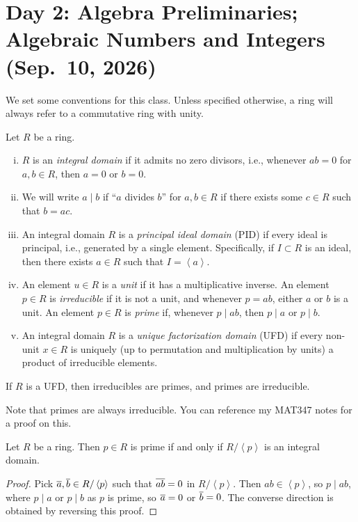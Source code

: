 \section{Day 2: Algebra Preliminaries; Algebraic Numbers and Integers (Sep.\ 10, 2026)}
We set some conventions for this class. Unless specified otherwise, a ring will always refer to a commutative ring with unity.
\begin{definition}[Preliminaries] \label{defn:class_conventions}
    Let $R$ be a ring.
    \begin{enumerate}[(i)]
        \item $R$ is an \textit{integral domain} if it admits no zero divisors, i.e., whenever $ab = 0$ for $a, b \in R$, then $a = 0$ or $b = 0$.
        \item We will write $a \mid b$ if ``$a$ divides $b$'' for $a, b \in R$ if there exists some $c \in R$ such that $b = ac$.
        \item An integral domain $R$ is a \textit{principal ideal domain} (PID) if every ideal is principal, i.e., generated by a single element. Specifically, if $I \subset R$ is an ideal, then there exists $a \in R$ such that $I = \left<a\right>$.
        \item An element $u \in R$ is a \textit{unit} if it has a multiplicative inverse. An element $p \in R$ is \textit{irreducible} if it is not a unit, and whenever $p = ab$, either $a$ or $b$ is a unit. An element $p \in R$ is \textit{prime} if, whenever $p \mid ab$, then $p \mid a$ or $p \mid b$.
        \item An integral domain $R$ is a \textit{unique factorization domain} (UFD) if every non-unit $x \in R$ is uniquely (up to permutation and multiplication by units) a product of irreducible elements.
    \end{enumerate}
\end{definition}

\begin{proposition} \label{prop:UFD_irreducible_prime}
    If $R$ is a UFD, then irreducibles are primes, and primes are irreducible.
\end{proposition}
Note that primes are always irreducible. You can reference my MAT347 notes for a proof on this.

\begin{proposition} \label{prop:quotient_by_prime_ideal_iff_integral_domain} %
    Let $R$ be a ring. Then $p \in R$ is prime if and only if $R/\left<p\right>$ is an integral domain.
\end{proposition}
\begin{proof}
    Pick $\overline a, \overline b \in R/\left<p\right>$ such that $\overline{ab} = 0$ in $R/\left<p\right>$. Then $ab \in \left<p\right>$, so $p \mid ab$, where $p \mid a$ or $p \mid b$ as $p$ is prime, so $\overline a = 0$ or $\overline b = 0$. The converse direction is obtained by reversing this proof.
\end{proof}

